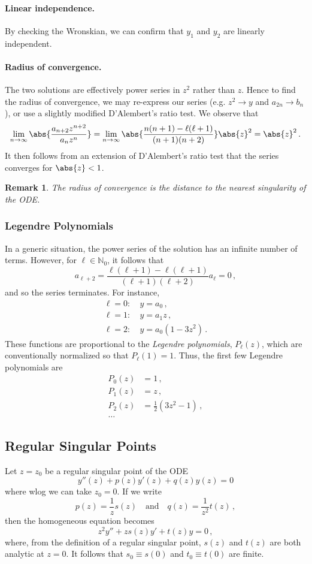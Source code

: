 \documentclass{article}
\theoremstyle{plain}\theoremheaderfont{\normalfont\itshape}\theorembodyfont{\rmfamily}\theoremseparator{.}\newtheorem*{rem}{Remark}\newtheorem*{ex}{Example}\newtheorem*{proof}{Proof}\newtheorem*{altp}{Alternative proof}
\theoremstyle{plain}\theoremheaderfont{\normalfont\bfseries}\theorembodyfont{\rmfamily}\theoremseparator{.}\newtheorem{thm}{Theorem}[section]\newtheorem{lem}[thm]{Lemma}\newtheorem{prop}[thm]{Proposition}\newtheorem*{cor}{Corollary}\newtheorem{defn}[thm]{Definition}\newtheorem{clm}[thm]{Claim}\newtheorem{clminproof}{Claim}
\theoremstyle{break}\theoremheaderfont{\normalfont\itshape}\theorembodyfont{\rmfamily}\theoremseparator{.\medskip}\newtheorem*{proofskip}{Proof}\newtheorem*{exs}{Examples}\newtheorem*{rems}{Remarks}
\theoremstyle{break}\theoremheaderfont{\normalfont\bfseries}\theorembodyfont{\rmfamily}\theoremseparator{.\medskip}\newtheorem{lemskip}[thm]{Lemma}\newtheorem{defnskip}[thm]{Definition}\newtheorem{propskip}[thm]{Proposition}\newtheorem{thmskip}[thm]{Theorem}
\numberwithin{equation}{section}
\begin{document}
	\paragraph{Linear independence.} By checking the Wronskian, we can confirm that \(y_1\) and \(y_2\) are linearly independent.

	\paragraph{Radius of convergence.} The two solutions are effectively power series in \(z^2\) rather than \(z\). Hence to find the radius of convergence, we may re-express our series (e.g. \(z^2\to y\) and \(a_{2n}\to b_n\)), or use a slightly modified D'Alembert's ratio test. We observe that
	\[\lim_{n\to\infty}\abs{\frac{a_{n+2}z^{n+2}}{a_nz^n}}=\lim_{n\to\infty}\abs{\frac{n(n+1)-\ell(\ell+1)}{(n+1)(n+2)}}\abs{z}^2=\abs{z}^2\,.\]
	It then follows from an extension of D'Alembert's ratio test that the series converges for \(\abs{z}<1\).
	\begin{rem}
		The radius of convergence is the distance to the nearest singularity of the ODE.
	\end{rem}

	\subsubsection*{Legendre Polynomials}
	In a generic situation, the power series of the solution has an infinite number of terms. However, for \(\ell\in\mathbb{N}_0\), it follows that
	\[a_{\ell+2}=\frac{\ell(\ell+1)-\ell(\ell+1)}{(\ell+1)(\ell+2)}a_\ell=0\,,\]
	and so the series terminates. For instance,
	\begin{align*}
		\ell=0:&\ y=a_0\,,\\
		\ell=1:&\ y=a_1z\,,\\
		\ell=2:&\ y=a_0(1-3z^2)\,.
	\end{align*}
	These functions are proportional to the \textit{Legendre polynomials}, \(P_\ell(z)\), which are conventionally normalized so that \(P_\ell(1)=1\). Thus, the first few Legendre polynomials are
	\begin{align*}
		P_0(z)&=1\,,\\
		P_1(z)&=z\,,\\
		P_2(z)&=\frac{1}{2}(3z^2-1)\,,\\
		\dots
	\end{align*}

	\subsection{Regular Singular Points}
	Let \(z=z_0\) be a regular singular point of the ODE
	\[y''(z)+p(z)y'(z)+q(z)y(z)=0\]
	where wlog we can take \(z_0=0\). If we write
	\[p(z)=\frac{1}{z}s(z)\quad\text{and}\quad q(z)=\frac{1}{z^2}t(z)\,,\]
	then the homogeneous equation becomes
	\[z^2y''+zs(z)y'+t(z)y=0\,,\]
	where, from the definition of a regular singular point, \(s(z)\) and \(t(z)\) are both analytic at \(z=0\). It follows that \(s_0\equiv s(0)\) and \(t_0\equiv t(0)\) are finite.
\end{document}
